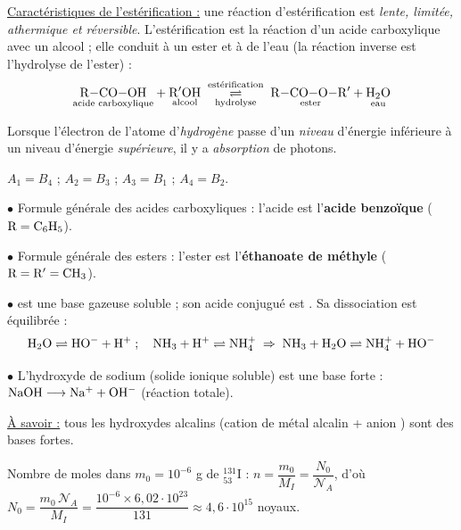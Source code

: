 \documentclass[11pt]{article}
\begin{document}


\underline{Caractéristiques de l'estérification :} une réaction d'estérification est \emph{lente, limitée, athermique et réversible}. L'estérification est la réaction d'un acide carboxylique  avec un alcool  ; elle conduit à un ester et à de l'eau (la réaction inverse est l'hydrolyse de l'ester) :
\[ \underset{\text{acide carboxylique}}{\mathrm{R{-}CO{-}OH}} + \underset{\text{alcool}}{\mathrm{R'OH}} \; \underset{\text{hydrolyse}}{\overset{\text{estérification}}{\rightleftharpoons}} \; \underset{\text{ester}}{\mathrm{R{-}CO{-}O{-}R'}} + \underset{\text{eau}}{\mathrm{H_2O}} \]

Lorsque l'électron de l'atome d'\emph{hydrogène} passe d'un \emph{niveau} d'énergie inférieure à un niveau d'énergie \emph{supérieure}, il y a \emph{absorption} de photons.

$A_1 = B_4$ ; \quad $A_2 = B_3$ ; \quad $A_3 = B_1$ ; \quad $A_4 = B_2$.

$\bullet$ Formule générale des acides carboxyliques  : l'acide est l'\textbf{acide benzoïque}  ($\mathrm{R} = \mathrm{C_6H_5}$).

$\bullet$ Formule générale des esters  : l'ester est l'\textbf{éthanoate de méthyle}  ($\mathrm{R} = \mathrm{R'} = \mathrm{CH_3}$).

$\bullet$  est une base gazeuse soluble ; son acide conjugué est . Sa dissociation est équilibrée :
\[ \mathrm{H_2O \rightleftharpoons HO^- + H^+} \;;\quad \mathrm{NH_3 + H^+ \rightleftharpoons NH_4^+} \;\Rightarrow\; \mathrm{NH_3 + H_2O \rightleftharpoons NH_4^+ + HO^-} \]

$\bullet$ L'hydroxyde de sodium  (solide ionique soluble) est une base forte : $\mathrm{NaOH \longrightarrow Na^+ + OH^-}$ (réaction totale).

\underline{À savoir :} tous les hydroxydes alcalins (cation de métal alcalin + anion ) sont des bases fortes.


 Nombre de moles dans $m_0 = 10^{-6}$ g de $^{131}_{53}\text{I}$ : $n = \dfrac{m_0}{M_I} = \dfrac{N_0}{\mathcal{N}_A}$, d'où $N_0 = \dfrac{m_0\,\mathcal{N}_A}{M_I} = \dfrac{10^{-6}\times 6{,}02\cdot10^{23}}{131} \approx 4{,}6\cdot10^{15}$ noyaux.
\end{document}
